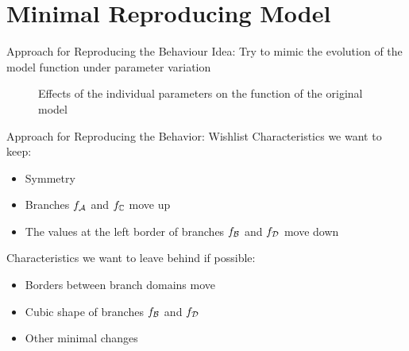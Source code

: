 
\section{Minimal Reproducing Model}

\begin{frame}{Approach for Reproducing the Behaviour}
    Idea:
    Try to mimic the evolution of the model function under parameter variation

    \vspace{-2.0em}
    \begin{figure}
        \centering
        \caption*{Effects of the individual parameters on the function of the original model}
    \end{figure}
\end{frame}

\begin{frame}{Approach for Reproducing the Behavior: Wishlist}
    Characteristics we want to keep:
    \begin{itemize}
        \item Symmetry
        \item Branches $f_{\mathcal{A}}$ and $f_{\mathbb{C}}$ move up
        \item The values at the left border of branches $f_{\mathcal{B}}$ and $f_{\mathcal{D}}$ move down
    \end{itemize}

    \vspace{2em}
    Characteristics we want to leave behind if possible:
    \begin{itemize}
        \item Borders between branch domains move
        \item Cubic shape of branches $f_{\mathcal{B}}$ and $f_{\mathcal{D}}$
        \item Other minimal changes
    \end{itemize}
\end{frame}

